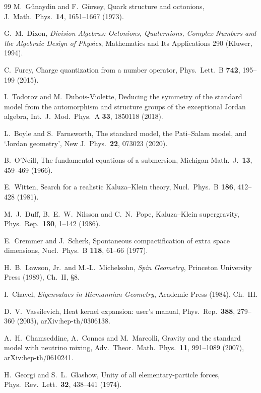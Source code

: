 \documentclass[aps,pra,onecolumn,superscriptaddress,nofootinbib,10pt]{revtex4-2}
\theoremstyle{definition}
\theoremstyle{remark}
\begin{document}
\begin{thebibliography}{99}
 M.~G\"unaydin and F.~G\"ursey, Quark structure and octonions, J.\ Math.\ Phys.\ \textbf{14}, 1651--1667 (1973).

 G.~M.~Dixon, \emph{Division Algebras: Octonions, Quaternions, Complex Numbers and the Algebraic Design of Physics}, Mathematics and Its Applications 290 (Kluwer, 1994).

 C.~Furey, Charge quantization from a number operator, Phys.\ Lett.\ B \textbf{742}, 195--199 (2015).

 I.~Todorov and M.~Dubois-Violette, Deducing the symmetry of the standard model from the automorphism and structure groups of the exceptional Jordan algebra, Int.\ J.\ Mod.\ Phys.\ A \textbf{33}, 1850118 (2018).

 L.~Boyle and S.~Farnsworth, The standard model, the Pati--Salam model, and `Jordan geometry', New J.\ Phys.\ \textbf{22}, 073023 (2020).

 B.~O'Neill, The fundamental equations of a submersion, Michigan Math.\ J.\ \textbf{13}, 459--469 (1966).

 E.~Witten, Search for a realistic Kaluza--Klein theory, Nucl.\ Phys.\ B \textbf{186}, 412--428 (1981).

 M.~J.~Duff, B.~E.~W.~Nilsson and C.~N.~Pope, Kaluza--Klein supergravity, Phys.\ Rep.\ \textbf{130}, 1--142 (1986).

 E.~Cremmer and J.~Scherk, Spontaneous compactification of extra space dimensions, Nucl.\ Phys.\ B \textbf{118}, 61--66 (1977).

 H.~B.~Lawson, Jr.\ and M.-L.~Michelsohn, \emph{Spin Geometry}, Princeton University Press (1989), Ch.~II, \S8.

 I.~Chavel, \emph{Eigenvalues in Riemannian Geometry}, Academic Press (1984), Ch.~III.

 D.~V.~Vassilevich, Heat kernel expansion: user's manual, Phys.\ Rep.\ \textbf{388}, 279--360 (2003), arXiv:hep-th/0306138.

 A.~H.~Chamseddine, A.~Connes and M.~Marcolli, Gravity and the standard model with neutrino mixing, Adv.\ Theor.\ Math.\ Phys.\ \textbf{11}, 991--1089 (2007), arXiv:hep-th/0610241.

 H.~Georgi and S.~L.~Glashow, Unity of all elementary-particle forces, Phys.\ Rev.\ Lett.\ \textbf{32}, 438--441 (1974).


\end{thebibliography}
\end{document}
